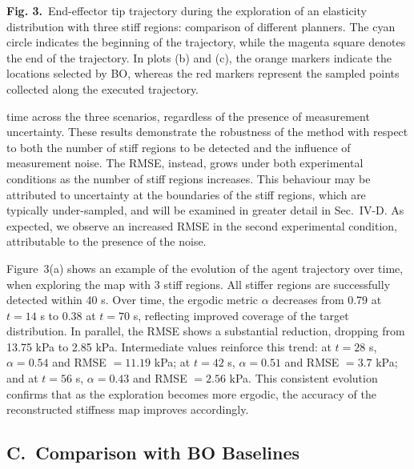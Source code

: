 \documentclass[11pt]{article}
\begin{document}
\vspace{0.4em}

\textbf{Fig. 3.}\ End-effector tip trajectory during the exploration
of an elasticity distribution with three stiff regions: comparison of
different planners. The cyan circle indicates the beginning of the
trajectory, while the magenta square denotes the end of the
trajectory. In plots (b) and (c), the orange markers indicate the
locations selected by BO, whereas the red markers represent the
sampled points collected along the executed trajectory.

\vspace{0.8em}

time across the three scenarios, regardless of the presence of
measurement uncertainty. These results demonstrate the robustness of
the method with respect to both the number of stiff regions to be
detected and the influence of measurement noise. The RMSE, instead,
grows under both experimental conditions as the number of stiff
regions increases. This behaviour may be attributed to uncertainty
at the boundaries of the stiff regions, which are typically
under-sampled, and will be examined in greater detail in Sec.~IV-D.
As expected, we observe an increased RMSE in the second experimental
condition, attributable to the presence of the noise.

Figure~3(a) shows an example of the evolution of the agent trajectory
over time, when exploring the map with 3 stiff regions. All stiffer
regions are successfully detected within 40 s. Over time, the
ergodic metric $\alpha$ decreases from 0.79 at $t = 14$ s to 0.38 at
$t = 70$ s, reflecting improved coverage of the target distribution.
In parallel, the RMSE shows a substantial reduction, dropping from
13.75 kPa to 2.85 kPa. Intermediate values reinforce this trend: at
$t = 28$ s, $\alpha = 0.54$ and RMSE $= 11.19$ kPa; at $t = 42$ s,
$\alpha = 0.51$ and RMSE $= 3.7$ kPa; and at $t = 56$ s,
$\alpha = 0.43$ and RMSE $= 2.56$ kPa. This consistent evolution
confirms that as the exploration becomes more ergodic, the accuracy
of the reconstructed stiffness map improves accordingly.

\subsection*{C.\ Comparison with BO Baselines}
\end{document}
